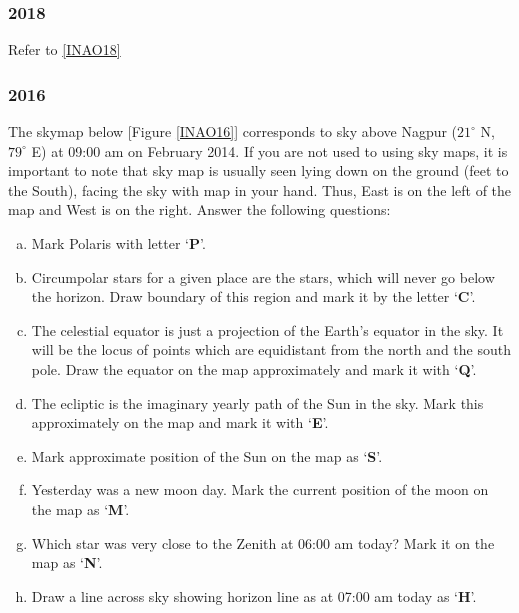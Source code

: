 \documentclass[a4paper,12pt]{extarticle}
\begin{document}
\subsubsection{2018}
Refer to \ref{INAO18}
\subsubsection{2016}

The skymap below [Figure \ref{INAO16}] corresponds to sky above Nagpur ($21^\circ$ N, $79^\circ$ E) at 09:00 am on  February 2014. If you are not used to using sky maps, it is important to note that sky map is usually seen lying down on the ground (feet to the South), facing the sky with map in your hand. Thus, East is on the left of the map and West is on the right. Answer the following questions:\\

\begin{enumerate}[a.]
    \item Mark Polaris with letter ‘\textbf{P}’.
    \item Circumpolar stars for a given place are the stars, which will never go below the horizon. Draw boundary of this region and mark it by the letter ‘\textbf{C}’.
    \item The celestial equator is just a projection of the Earth’s equator in the sky. It will be the locus of points which are equidistant from the north and the south pole. Draw the equator on the map approximately and mark it with ‘\textbf{Q}’.
    \item The ecliptic is the imaginary yearly path of the Sun in the sky. Mark this approximately on the map and mark it with ‘\textbf{E}’.
    \item Mark approximate position of the Sun on the map as ‘\textbf{S}’.
    \item Yesterday was a new moon day. Mark the current position of the moon on the map as ‘\textbf{M}’.
    \item Which star was very close to the Zenith at 06:00 am today? Mark it on the map as ‘\textbf{N}’.
    \item Draw a line across sky showing horizon line as at 07:00 am today as ‘\textbf{H}’.
\end{enumerate}
\end{document}
